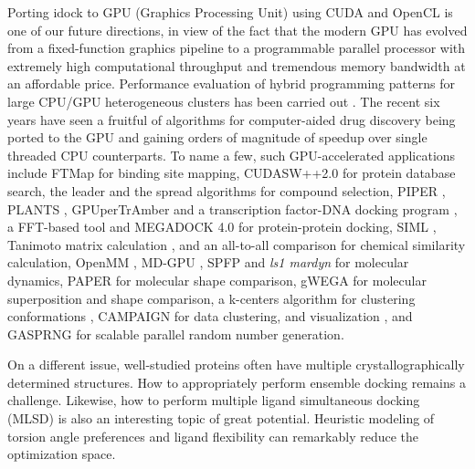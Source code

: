 Porting idock to GPU (Graphics Processing Unit) using CUDA and OpenCL is one of our future directions, in view of the fact that the modern GPU has evolved from a fixed-function graphics pipeline to a programmable parallel processor with extremely high computational throughput and tremendous memory bandwidth at an affordable price. Performance evaluation of hybrid programming patterns for large CPU/GPU heterogeneous clusters has been carried out \citep{1035}. The recent six years have seen a fruitful of algorithms for computer-aided drug discovery being ported to the GPU and gaining orders of magnitude of speedup over single threaded CPU counterparts. To name a few, such GPU-accelerated applications include FTMap \citep{722} for binding site mapping, CUDASW++2.0 \citep{189} for protein database search, the leader and the spread algorithms \citep{750} for compound selection, PIPER \citep{723}, PLANTS \citep{779}, GPUperTrAmber \citep{1270} and a transcription factor-DNA docking program \citep{1267,1266}, a FFT-based tool \citep{242,652} and MEGADOCK 4.0 \citep{1588} for protein-protein docking, SIML \citep{726}, Tanimoto matrix calculation \citep{881}, and an all-to-all comparison \citep{1532} for chemical similarity calculation, OpenMM \citep{373}, MD-GPU \citep{374}, SPFP \citep{1261} and \textit{ls1 mardyn} \citep{1488} for molecular dynamics, PAPER \citep{491} for molecular shape comparison, gWEGA \citep{1388} for molecular superposition and shape comparison, a k-centers algorithm for clustering conformations \citep{1275}, CAMPAIGN \citep{932} for data clustering, and visualization \citep{986}, and GASPRNG \citep{1401} for scalable parallel random number generation.

On a different issue, well-studied proteins often have multiple crystallographically determined structures. How to appropriately perform ensemble docking \citep{966,547,1128} remains a challenge. Likewise, how to perform multiple ligand simultaneous docking (MLSD) \citep{869,1292} is also an interesting topic of great potential. Heuristic modeling of torsion angle preferences \citep{1306,1537} and ligand flexibility \citep{1533} can remarkably reduce the optimization space.


\chapterend
